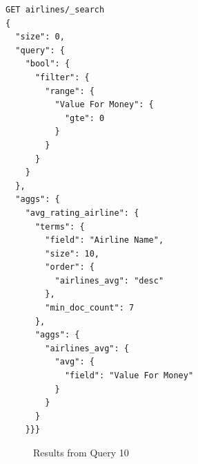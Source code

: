 \documentclass{Configuration_Files/PoliMi3i_thesis}
\begin{document}
\begin{enumerate}
\begin{verbatim}
GET airlines/_search
{
  "size": 0,
  "query": {
    "bool": {
      "filter": {
        "range": {
          "Value For Money": {
            "gte": 0
          }
        }
      }
    }
  },
  "aggs": {
    "avg_rating_airline": {
      "terms": {
        "field": "Airline Name",
        "size": 10,
        "order": {
          "airlines_avg": "desc"
        },
        "min_doc_count": 7
      },
      "aggs": {
        "airlines_avg": {
          "avg": {
            "field": "Value For Money"
          }
        }
      }
    }}}
\end{verbatim}
\begin{figure}[H]
    \centering
    \quad
    \caption{Results from Query 10}

\end{figure}
\end{enumerate}
\end{document}
